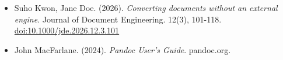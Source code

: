 \documentclass[11pt]{article}
\date{}
\begin{document}
\begin{itemize}
\item Suho Kwon, Jane Doe. (2026). \emph{Converting documents without an
external engine}. Journal of Document Engineering. 12(3), 101-118.
\href{https://doi.org/10.1000/jde.2026.12.3.101}{doi:10.1000/jde.2026.12.3.101}
\item John MacFarlane. (2024). \emph{Pandoc User's Guide}. pandoc.org.
\end{itemize}
\end{document}
